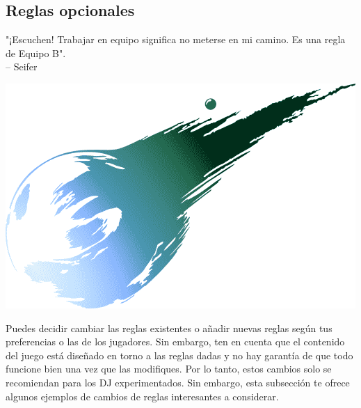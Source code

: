 \subsection*{\hypertarget{optrules}{Reglas opcionales}}
%
%
"¡Escuchen! Trabajar en equipo significa no meterse en mi camino. Es una regla de Equipo B".\\
\indent -- Seifer 
%
\begin{center} \includegraphics[width=\columnwidth]{./art/images/ff7.png} \end{center}
%
\vfill
%
Puedes decidir cambiar las reglas existentes o añadir nuevas reglas según tus preferencias o las de los jugadores. Sin embargo, ten en cuenta que el contenido del juego está diseñado en torno a las reglas dadas y no hay garantía de que todo funcione bien una vez que las modifiques. Por lo tanto, estos cambios solo se recomiendan para los DJ experimentados. Sin embargo, esta subsección te ofrece algunos ejemplos de cambios de reglas interesantes a considerar. 

\vfill

